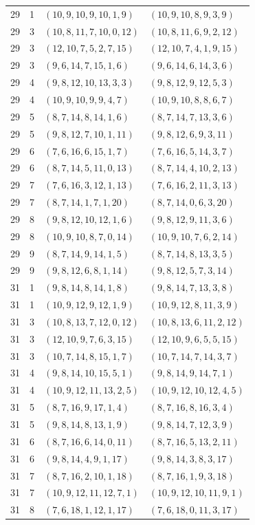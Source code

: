 \begin{longtable}{rrll}
29&1&$(10,9,10,9,10,1,9)$&$(10,9,10,8,9,3,9)$\\
29&3&$(10,8,11,7,10,0,12)$&$(10,8,11,6,9,2,12)$\\
29&3&$(12,10,7,5,2,7,15)$&$(12,10,7,4,1,9,15)$\\
29&3&$(9,6,14,7,15,1,6)$&$(9,6,14,6,14,3,6)$\\
29&4&$(9,8,12,10,13,3,3)$&$(9,8,12,9,12,5,3)$\\
29&4&$(10,9,10,9,9,4,7)$&$(10,9,10,8,8,6,7)$\\
29&5&$(8,7,14,8,14,1,6)$&$(8,7,14,7,13,3,6)$\\
29&5&$(9,8,12,7,10,1,11)$&$(9,8,12,6,9,3,11)$\\
29&6&$(7,6,16,6,15,1,7)$&$(7,6,16,5,14,3,7)$\\
29&6&$(8,7,14,5,11,0,13)$&$(8,7,14,4,10,2,13)$\\
29&7&$(7,6,16,3,12,1,13)$&$(7,6,16,2,11,3,13)$\\
29&7&$(8,7,14,1,7,1,20)$&$(8,7,14,0,6,3,20)$\\
29&8&$(9,8,12,10,12,1,6)$&$(9,8,12,9,11,3,6)$\\
29&8&$(10,9,10,8,7,0,14)$&$(10,9,10,7,6,2,14)$\\
29&9&$(8,7,14,9,14,1,5)$&$(8,7,14,8,13,3,5)$\\
29&9&$(9,8,12,6,8,1,14)$&$(9,8,12,5,7,3,14)$\\
31&1&$(9,8,14,8,14,1,8)$&$(9,8,14,7,13,3,8)$\\
31&1&$(10,9,12,9,12,1,9)$&$(10,9,12,8,11,3,9)$\\
31&3&$(10,8,13,7,12,0,12)$&$(10,8,13,6,11,2,12)$\\
31&3&$(12,10,9,7,6,3,15)$&$(12,10,9,6,5,5,15)$\\
31&3&$(10,7,14,8,15,1,7)$&$(10,7,14,7,14,3,7)$\\
31&4&$(9,8,14,10,15,5,1)$&$(9,8,14,9,14,7,1)$\\
31&4&$(10,9,12,11,13,2,5)$&$(10,9,12,10,12,4,5)$\\
31&5&$(8,7,16,9,17,1,4)$&$(8,7,16,8,16,3,4)$\\
31&5&$(9,8,14,8,13,1,9)$&$(9,8,14,7,12,3,9)$\\
31&6&$(8,7,16,6,14,0,11)$&$(8,7,16,5,13,2,11)$\\
31&6&$(9,8,14,4,9,1,17)$&$(9,8,14,3,8,3,17)$\\
31&7&$(8,7,16,2,10,1,18)$&$(8,7,16,1,9,3,18)$\\
31&7&$(10,9,12,11,12,7,1)$&$(10,9,12,10,11,9,1)$\\
31&8&$(7,6,18,1,12,1,17)$&$(7,6,18,0,11,3,17)$\\

\end{longtable}
